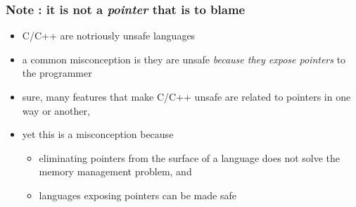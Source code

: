\documentclass[12pt,dvipdfmx]{beamer}
\newif\ifeng
\newcommand{\aka}[1]{{\color{red}#1}}
\begin{document}
\ifeng
\begin{frame}
  \frametitle{Note : it is not a {\it pointer} that is to blame}
  \begin{itemize}
  \item C/C++ are notriously unsafe languages
  \item a common misconception is
    they are unsafe \aka{\it because they expose pointers} to the programmer
  \item sure, many features that make C/C++ unsafe are related to pointers
    in one way or another,
  \item yet this is a misconception because
    \begin{itemize}
    \item eliminating pointers from the surface of a language does not solve
      the memory management problem, and
    \item languages exposing pointers can be made safe
    \end{itemize}
  \end{itemize}
\end{frame}
\end{document}
